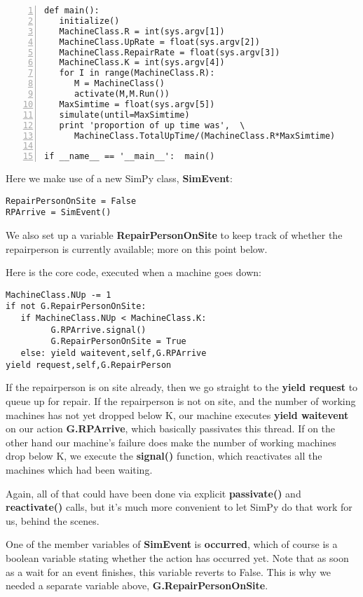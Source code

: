\documentclass[11pt]{article}
\begin{document}
\begin{Verbatim}[fontsize=\relsize{-2},numbers=left]
def main():
   initialize()  
   MachineClass.R = int(sys.argv[1])
   MachineClass.UpRate = float(sys.argv[2])
   MachineClass.RepairRate = float(sys.argv[3])
   MachineClass.K = int(sys.argv[4])
   for I in range(MachineClass.R):
      M = MachineClass()
      activate(M,M.Run())
   MaxSimtime = float(sys.argv[5])
   simulate(until=MaxSimtime)
   print 'proportion of up time was',  \
      MachineClass.TotalUpTime/(MachineClass.R*MaxSimtime)

if __name__ == '__main__':  main()
\end{Verbatim}

Here we make use of a new SimPy class, {\bf SimEvent}:

\begin{Verbatim}[fontsize=\relsize{-2}]
RepairPersonOnSite = False
RPArrive = SimEvent()
\end{Verbatim}

We also set up a variable {\bf RepairPersonOnSite} to keep track of
whether the repairperson is currently available; more on this point
below.

Here is the core code, executed when a machine goes down:

\begin{Verbatim}[fontsize=\relsize{-2}]
MachineClass.NUp -= 1
if not G.RepairPersonOnSite:
   if MachineClass.NUp < MachineClass.K:
         G.RPArrive.signal()
         G.RepairPersonOnSite = True
   else: yield waitevent,self,G.RPArrive
yield request,self,G.RepairPerson
\end{Verbatim}

If the repairperson is on site already, then we go straight to the {\bf
yield request} to queue up for repair.  If the repairperson is not on
site, and the number of working machines has not yet dropped below K,
our machine executes {\bf yield waitevent} on our action {\bf
G.RPArrive}, which basically passivates this thread.  If on the other
hand our machine's failure does make the number of working machines drop
below K, we execute the {\bf signal()} function, which reactivates all
the machines which had been waiting.  

Again, all of that could have been done via explicit {\bf passivate()} 
and {\bf reactivate()} calls, but it's much more convenient to let
SimPy do that work for us, behind the scenes.

One of the member variables of {\bf SimEvent} is {\bf occurred}, which
of course is a boolean variable stating whether the action has occurred
yet.  Note that as soon as a wait for an event finishes, this variable
reverts to False.  This is why we needed a separate variable above,
{\bf G.RepairPersonOnSite}.
\end{document}
